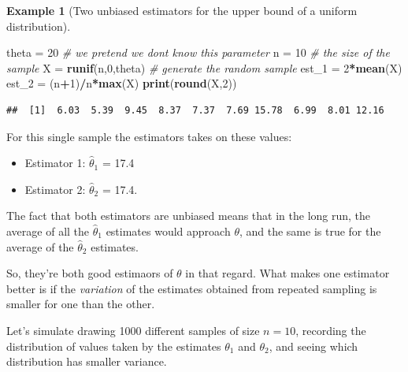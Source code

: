 \documentclass[
]{book}
\newenvironment{Shaded}{\begin{snugshade}}{\end{snugshade}}
\newcommand{\CommentTok}[1]{\textcolor[rgb]{0.56,0.35,0.01}{\textit{#1}}}
\newcommand{\DecValTok}[1]{\textcolor[rgb]{0.00,0.00,0.81}{#1}}
\newcommand{\FunctionTok}[1]{\textcolor[rgb]{0.13,0.29,0.53}{\textbf{#1}}}
\newcommand{\NormalTok}[1]{#1}
\newcommand{\OtherTok}[1]{\textcolor[rgb]{0.56,0.35,0.01}{#1}}
\newcommand{\SpecialCharTok}[1]{\textcolor[rgb]{0.81,0.36,0.00}{\textbf{#1}}}
\providecommand{\tightlist}{%
  \setlength{\itemsep}{0pt}\setlength{\parskip}{0pt}}
\theoremstyle{definition}
\theoremstyle{definition}
\newtheorem{example}{Example}[chapter]
\theoremstyle{definition}
\theoremstyle{definition}
\theoremstyle{remark}
\begin{document}
\begin{example}[Two unbiased estimators for the upper bound of a uniform distribution]
\begin{Shaded}
\begin{Highlighting}[]
\NormalTok{theta }\OtherTok{=} \DecValTok{20} \CommentTok{\# we pretend we don\textquotesingle{}t know this parameter}
\NormalTok{n }\OtherTok{=} \DecValTok{10} \CommentTok{\# the size of the sample}
\NormalTok{X }\OtherTok{=} \FunctionTok{runif}\NormalTok{(n,}\DecValTok{0}\NormalTok{,theta) }\CommentTok{\# generate the random sample}
\NormalTok{est\_1 }\OtherTok{=} \DecValTok{2}\SpecialCharTok{*}\FunctionTok{mean}\NormalTok{(X)}
\NormalTok{est\_2 }\OtherTok{=}\NormalTok{ (n}\SpecialCharTok{+}\DecValTok{1}\NormalTok{)}\SpecialCharTok{/}\NormalTok{n}\SpecialCharTok{*}\FunctionTok{max}\NormalTok{(X)}
\FunctionTok{print}\NormalTok{(}\FunctionTok{round}\NormalTok{(X,}\DecValTok{2}\NormalTok{))}
\end{Highlighting}
\end{Shaded}

\begin{verbatim}
##  [1]  6.03  5.39  9.45  8.37  7.37  7.69 15.78  6.99  8.01 12.16
\end{verbatim}

For this single sample the estimators takes on these values:

\begin{itemize}
\tightlist
\item
  Estimator 1: \(\hat{\theta}_1\) = 17.4
\item
  Estimator 2: \(\hat{\theta}_2\) = 17.4.
\end{itemize}

The fact that both estimators are unbiased means that in the long run, the average of all the \(\hat{\theta}_1\) estimates would approach \(\theta\), and the same is true for the average of the \(\hat{\theta}_2\) estimates.

So, they're both good estimaors of \(\theta\) in that regard. What makes one estimator better is if the \emph{variation} of the estimates obtained from repeated sampling is smaller for one than the other.

Let's simulate drawing 1000 different samples of size \(n = 10\), recording the distribution of values taken by the estimates \(\theta_1\) and \(\theta_2\), and seeing which distribution has smaller variance.


\end{example}
\end{document}
